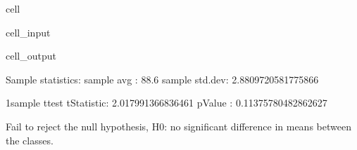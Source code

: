 \documentclass[letterpaper,10pt,italian]{jupyterBook}
\begin{document}
\begin{sphinxuseclass}{cell}
\begin{sphinxVerbatimInput}
\begin{sphinxuseclass}{cell_input}
\begin{sphinxVerbatim}[commandchars=\\\{\}]
  
   
     
              
\end{sphinxVerbatim}

\end{sphinxuseclass}\end{sphinxVerbatimInput}
\begin{sphinxVerbatimOutput}

\begin{sphinxuseclass}{cell_output}
\begin{sphinxVerbatim}[commandchars=\\\{\}]
Sample statistics:
 sample avg    : 88.6
 sample std.dev: 2.8809720581775866

1\PYGZhy{}sample t\PYGZhy{}test
 t\PYGZhy{}Statistic: 2.017991366836461
 p\PYGZhy{}Value    : 0.11375780482862627

\PYGZgt{} Fail to reject the null hypothesis, H0: no significant difference in means between the classes.
\end{sphinxVerbatim}

\begin{sphinxVerbatim}
\end{sphinxVerbatim}

\noindent{}

\end{sphinxuseclass}\end{sphinxVerbatimOutput}

\end{sphinxuseclass}
\end{document}
